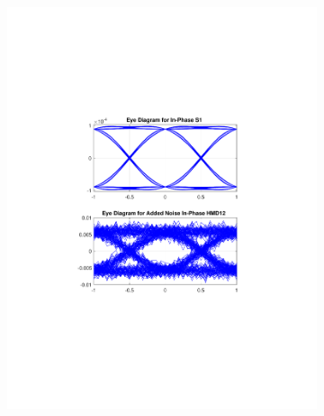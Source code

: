 \begin{refsection}
\begin{figure}[H]
\begin{minipage}{\linewidth}
\begin{subfigure}{.45\textwidth}
		\includegraphics[clip, trim=5cm 7cm 5cm 7cm, width=\textwidth]{./sdf/m_qam_system/figures/eyes/if_n_nmf_45_60_rc_09.pdf}
	\end{subfigure}
	\begin{subfigure}{.45\textwidth}
		\centering

\end{subfigure}
\end{minipage}
\end{figure}
\end{refsection}

